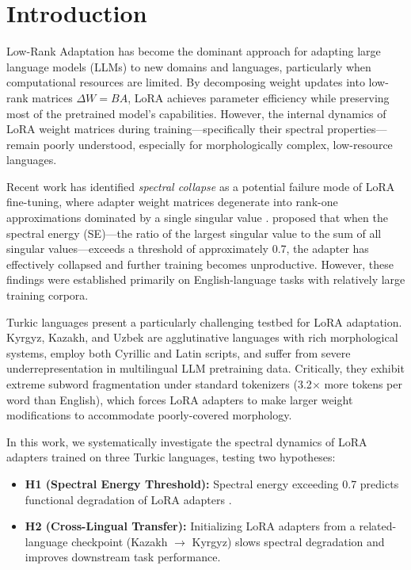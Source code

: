 \documentclass[11pt]{article}
\begin{document}
\section{Introduction}

Low-Rank Adaptation \cite{hu2022lora} has become the dominant approach for adapting large language models (LLMs) to new domains and languages, particularly when computational resources are limited. By decomposing weight updates into low-rank matrices $\Delta W = BA$, LoRA achieves parameter efficiency while preserving most of the pretrained model's capabilities. However, the internal dynamics of LoRA weight matrices during training---specifically their spectral properties---remain poorly understood, especially for morphologically complex, low-resource languages.

Recent work has identified \emph{spectral collapse} as a potential failure mode of LoRA fine-tuning, where adapter weight matrices degenerate into rank-one approximations dominated by a single singular value \cite{biderman2024lora,jang2024lora}. \citet{biderman2024lora} proposed that when the spectral energy (SE)---the ratio of the largest singular value to the sum of all singular values---exceeds a threshold of approximately 0.7, the adapter has effectively collapsed and further training becomes unproductive. However, these findings were established primarily on English-language tasks with relatively large training corpora.

Turkic languages present a particularly challenging testbed for LoRA adaptation. Kyrgyz, Kazakh, and Uzbek are agglutinative languages with rich morphological systems, employ both Cyrillic and Latin scripts, and suffer from severe underrepresentation in multilingual LLM pretraining data. Critically, they exhibit extreme subword fragmentation under standard tokenizers (3.2$\times$ more tokens per word than English), which forces LoRA adapters to make larger weight modifications to accommodate poorly-covered morphology.

In this work, we systematically investigate the spectral dynamics of LoRA adapters trained on three Turkic languages, testing two hypotheses:

\begin{itemize}
    \item \textbf{H1 (Spectral Energy Threshold):} Spectral energy exceeding 0.7 predicts functional degradation of LoRA adapters \cite{biderman2024lora}.
    \item \textbf{H2 (Cross-Lingual Transfer):} Initializing LoRA adapters from a related-language checkpoint (Kazakh $\rightarrow$ Kyrgyz) slows spectral degradation and improves downstream task performance.
\end{itemize}
\end{document}
